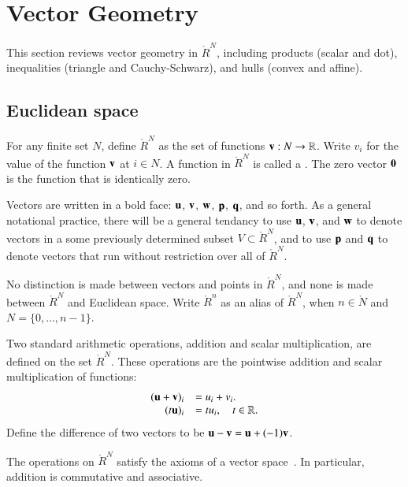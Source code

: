 \section{Vector Geometry}

This section reviews vector geometry in $\ring{R}^N$, including
products (scalar and dot), inequalities (triangle and Cauchy-Schwarz),
and hulls (convex and affine).

\subsection{Euclidean space}

\begin{definition}
  For any finite set $N$, define $\ring{R}^N$ as the set of functions
  ${\mathbf v}:N\to\mathbb{R}$. Write $v_i$ for the value of the function ${\mathbf v}$ at
  $i\in N$.  %
  A function in $\ring{R}^N$ is called a .  The zero
  vector ${\mathbf 0}$ is the function that is identically zero.
\end{definition}
%
Vectors are written in a bold face: ${\mathbf u}$, ${\mathbf v}$, ${\mathbf w}$, ${\mathbf p}$, ${\mathbf q}$, and
so forth.  As a general notational practice, there will be a general
tendancy to use ${\mathbf u}$, ${\mathbf v}$, and ${\mathbf w}$ to denote vectors in a some
previously determined subset $V\subset \ring{R}^N$, and to use ${\mathbf p}$
and ${\mathbf q}$ to denote vectors that run without restriction over all of
$\ring{R}^N$.

No distinction is made between vectors and points in $\ring{R}^N$, and
none is made between $\ring{R}^N$ and Euclidean space.  Write
$\ring{R}^n$ as an alias of $\ring{R}^N$, when $n\in\ring{N}$ and
$N=\{0,\ldots,n-1\}$.  

\begin{definition}
  Two standard arithmetic operations, addition and scalar
  multiplication, are defined on the set $\ring{R}^N$.  These
  operations are the pointwise addition and scalar multiplication of
  functions:
\begin{equation}
\begin{array}{rll}
(\u + \v)_i &= u_i + v_i.\\
(t \u)_i &= t u_i,\quad t\in\ring{R}.\\  %
\end{array}
\end{equation}
%
%
Define the difference of two vectors to be ${\mathbf u} - {\mathbf v} = {\mathbf u} + (-1) {\mathbf v}$.
%
\end{definition}
The operations on $\ring{R}^N$ 
satisfy the axioms of a vector space~\cite{unknown}. %
In particular, addition is commutative and associative.


